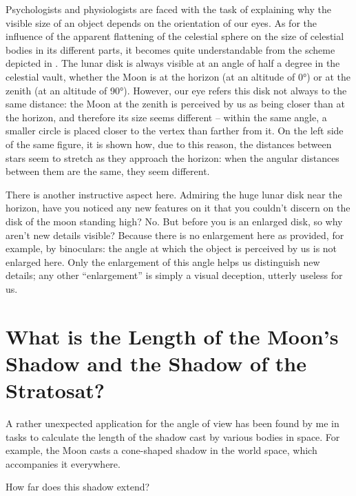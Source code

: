 Psychologists and physiologists are faced with the task of explaining why the visible size of an object depends on the orientation of our eyes. As for the influence of the apparent flattening of the celestial sphere on the size of celestial bodies in its different parts, it becomes quite understandable from the scheme depicted in . The lunar disk is always visible at an angle of half a degree in the celestial vault, whether the Moon is at the horizon (at an altitude of \ang{0}) or at the zenith (at an altitude of \ang{90}). However, our eye refers this disk not always to the same distance: the Moon at the zenith is perceived by us as being closer than at the horizon, and therefore its size seems different -- within the same angle, a smaller circle is placed closer to the vertex than farther from it. On the left side of the same figure, it is shown how, due to this reason, the distances between stars seem to stretch as they approach the horizon: when the angular distances between them are the same, they seem different.

There is another instructive aspect here. Admiring the huge lunar disk near the horizon, have you noticed any new features on it that you couldn't discern on the disk of the moon standing high? No. But before you is an enlarged disk, so why aren't new details visible? Because there is no enlargement here as provided, for example, by binoculars: the angle at which the object is perceived by us is not enlarged here. Only the enlargement of this angle helps us distinguish new details; any other ``enlargement'' is simply a visual deception, utterly useless for us.


\section[The length of the Moon's Shadow]{What is the Length of the Moon's Shadow and the Shadow of the Stratosat?}
\label{sec-3.14}

A rather unexpected application for the angle of view has been found by me in tasks to calculate the length of the shadow cast by various bodies in space. For example, the Moon casts a cone-shaped shadow in the world space, which accompanies it everywhere.

How far does this shadow extend?

